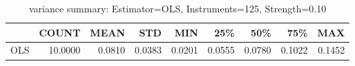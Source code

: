 \begin{table}[ht]
\centering
\caption{variance summary: Estimator=OLS, Instruments=125, Strength=0.10}
\begin{tabular}{lrrrrrrrr}
\toprule
 & COUNT & MEAN & STD & MIN & 25\% & 50\% & 75\% & MAX \\
\midrule
OLS & 10.0000 & 0.0810 & 0.0383 & 0.0201 & 0.0555 & 0.0780 & 0.1022 & 0.1452 \\
\bottomrule
\end{tabular}
\end{table}
